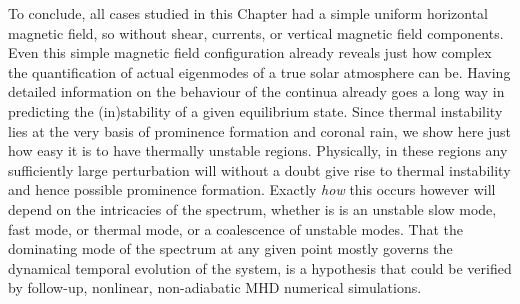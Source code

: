To conclude, all cases studied in this Chapter had a simple uniform horizontal magnetic field, so without shear, currents, or vertical magnetic field components. Even this simple magnetic field configuration already reveals just how complex the quantification of actual eigenmodes of a true solar atmosphere can be. Having detailed information on the behaviour of the continua already goes a long way in predicting the (in)stability of a given equilibrium state. Since thermal instability lies at the very basis of prominence formation and coronal rain, we show here just how easy it is to have thermally unstable regions. Physically, in these regions any sufficiently large perturbation will without a doubt give rise to thermal instability and hence possible prominence formation. Exactly \emph{how} this occurs however will depend on the intricacies of the spectrum, whether is is an unstable slow mode, fast mode, or thermal mode, or a coalescence of unstable modes. That the dominating mode of the spectrum at any given point mostly governs the dynamical temporal evolution of the system, is a hypothesis that could be verified by follow-up, nonlinear, non-adiabatic MHD numerical simulations.



\cleardoublepage
